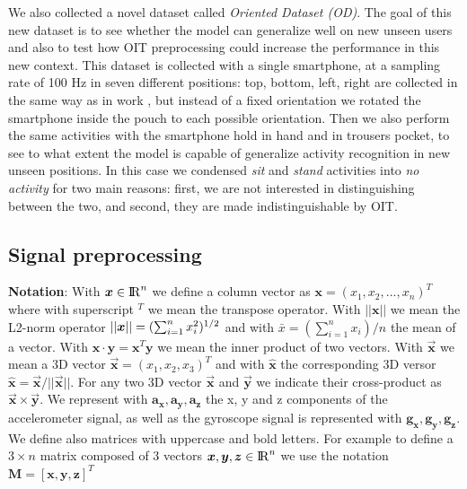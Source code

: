 We also collected a novel dataset called \textit{Oriented Dataset
  (OD)}. The goal of this new dataset is to see whether the model can
generalize well on new unseen users and also to test how OIT
preprocessing could increase the performance in this new context. This
dataset is collected with a single smartphone, at a sampling rate of
100 Hz in seven different positions: top, bottom, left, right are
collected in the same way as in work \cite{stisen2015smart}, but
instead of a fixed orientation we rotated the smartphone inside the
pouch to each possible orientation. Then we also perform the same
activities with the smartphone hold in hand and in trousers pocket, to
see to what extent the model is capable of generalize activity
recognition in new unseen positions. In this case we condensed
\textit{sit} and \textit{stand} activities into \textit{no activity}
for two main reasons: first, we are not interested in distinguishing
between the two, and second, they are made indistinguishable by OIT.

\subsection{Signal preprocessing}

\textbf{Notation}: With $\boldsymbol{x} \in {\rm I\!R}^{n}$ we define a column vector as $\boldsymbol{x}=(x_{1}, x_{2}, ..., x_{n})^{T}$ where with superscript $^T$ we mean the transpose operator. With $\boldsymbol{||x||}$ we mean the L2-norm operator $||\boldsymbol{x}|| = (\sum_{i=1}^{n} x_{i}^{2})^{1/2}$ and with $\bar{x} = (\sum_{i=1}^{n} x_{i}) / n$ the mean of a vector. With $\boldsymbol{x} \cdot \boldsymbol{y} =\boldsymbol{x}^{T}\boldsymbol{y} $ we mean the inner product of two vectors. With $\boldsymbol{\vec{x}}$ we mean a 3D vector $\boldsymbol{\vec{x}} = (x_{1}, x_{2}, x_{3})^{T}$ and with $\boldsymbol{\hat{x}}$ the corresponding 3D versor $\boldsymbol{\hat{x}}=\boldsymbol{\vec{x}}/ ||\boldsymbol{\vec{x}}||$. For any two 3D vector $\boldsymbol{\vec{x}}$ and $\boldsymbol{\vec{y}}$ we indicate their cross-product as $\boldsymbol{\vec{x}} \times \boldsymbol{\vec{y}}$. We represent with $\boldsymbol{a_{x}}, \boldsymbol{a_{y}}, \boldsymbol{a_{z}}$ the x, y and z components of the accelerometer signal, as well as the gyroscope signal is represented with $\boldsymbol{g_{x}}, \boldsymbol{g_{y}}, \boldsymbol{g_{z}}$. We define also matrices with uppercase and bold letters. For example to define a $3 \times n$ matrix composed of 3 vectors \mbox{$\boldsymbol{x}, \boldsymbol{y}, \boldsymbol{z} \in {\rm I\!R}^{n}$} we use the notation \mbox{$\boldsymbol{M} = [\boldsymbol{x}, \boldsymbol{y}, \boldsymbol{z}]^{T}$}\\

